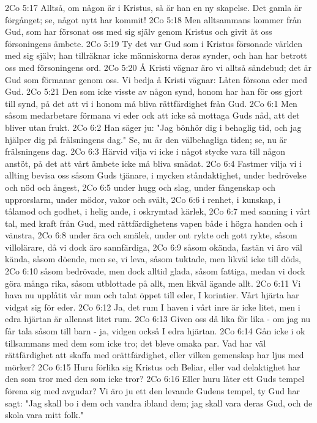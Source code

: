 2Co 5:17  Alltså, om någon är i Kristus, så är han en ny skapelse. Det gamla är förgånget; se, något nytt har kommit!
2Co 5:18  Men alltsammans kommer från Gud, som har försonat oss med sig själv genom Kristus och givit åt oss försoningens ämbete.
2Co 5:19  Ty det var Gud som i Kristus försonade världen med sig själv; han tillräknar icke människorna deras synder, och han har betrott oss med försoningens ord.
2Co 5:20  Å Kristi vägnar äro vi alltså sändebud; det är Gud som förmanar genom oss. Vi bedja å Kristi vägnar: Låten försona eder med Gud.
2Co 5:21  Den som icke visste av någon synd, honom har han för oss gjort till synd, på det att vi i honom må bliva rättfärdighet från Gud.
2Co 6:1  Men såsom medarbetare förmana vi eder ock att icke så mottaga Guds nåd, att det bliver utan frukt.
2Co 6:2  Han säger ju: "Jag bönhör dig i behaglig tid, och jag hjälper dig på frälsningens dag." Se, nu är den välbehagliga tiden; se, nu är frälsningens dag.
2Co 6:3  Härvid vilja vi icke i något stycke vara till någon anstöt, på det att vårt ämbete icke må bliva smädat.
2Co 6:4  Fastmer vilja vi i allting bevisa oss såsom Guds tjänare, i mycken ståndaktighet, under bedrövelse och nöd och ångest,
2Co 6:5  under hugg och slag, under fångenskap och upprorslarm, under mödor, vakor och svält,
2Co 6:6  i renhet, i kunskap, i tålamod och godhet, i helig ande, i oskrymtad kärlek,
2Co 6:7  med sanning i vårt tal, med kraft från Gud, med rättfärdighetens vapen både i högra handen och i vänstra,
2Co 6:8  under ära och smälek, under ont rykte och gott rykte, såsom villolärare, då vi dock äro sannfärdiga,
2Co 6:9  såsom okända, fastän vi äro väl kända, såsom döende, men se, vi leva, såsom tuktade, men likväl icke till döds,
2Co 6:10  såsom bedrövade, men dock alltid glada, såsom fattiga, medan vi dock göra många rika, såsom utblottade på allt, men likväl ägande allt.
2Co 6:11  Vi hava nu upplåtit vår mun och talat öppet till eder, I korintier. Vårt hjärta har vidgat sig för eder.
2Co 6:12  Ja, det rum I haven i vårt inre är icke litet, men i edra hjärtan är allenast litet rum.
2Co 6:13  Given oss då lika för lika - om jag nu får tala såsom till barn - ja, vidgen också I edra hjärtan.
2Co 6:14  Gån icke i ok tillsammans med dem som icke tro; det bleve omaka par. Vad har väl rättfärdighet att skaffa med orättfärdighet, eller vilken gemenskap har ljus med mörker?
2Co 6:15  Huru förlika sig Kristus och Beliar, eller vad delaktighet har den som tror med den som icke tror?
2Co 6:16  Eller huru låter ett Guds tempel förena sig med avgudar? Vi äro ju ett den levande Gudens tempel, ty Gud har sagt: "Jag skall bo i dem och vandra ibland dem; jag skall vara deras Gud, och de skola vara mitt folk."
